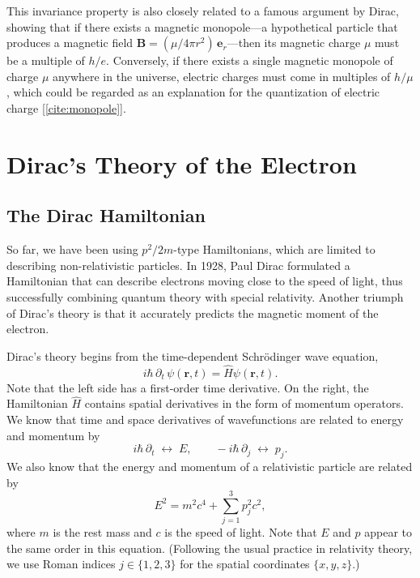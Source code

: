 \documentclass[prx,12pt]{revtex4-2}
\begin{document}
This invariance property is also closely related to a famous argument
by Dirac, showing that if there exists a magnetic monopole---a
hypothetical particle that produces a magnetic field $\mathbf{B} =
(\mu/4\pi r^2)\, \mathbf{e}_r$---then its magnetic charge $\mu$ must
be a multiple of $h/e$.  Conversely, if there exists a single magnetic
monopole of charge $\mu$ anywhere in the universe, electric charges
must come in multiples of $h/\mu$, which could be regarded as an
explanation for the quantization of electric charge
[\ref{cite:monopole}].

\section{Dirac's Theory of the Electron}

\subsection{The Dirac Hamiltonian}
\label{sec:DiracH}

So far, we have been using $p^2/2m$-type Hamiltonians, which are
limited to describing non-relativistic particles.  In 1928, Paul Dirac
formulated a Hamiltonian that can describe electrons moving close to
the speed of light, thus successfully combining quantum theory with
special relativity. Another triumph of Dirac's theory is that it
accurately predicts the magnetic moment of the electron.

Dirac's theory begins from the time-dependent Schr\"odinger wave
equation,
\begin{equation}
  i\hbar\, \partial_t\, \psi(\mathbf{r},t)
  = \hat{H} \psi(\mathbf{r},t).
  \label{schrod}
\end{equation}
Note that the left side has a first-order time derivative.  On the
right, the Hamiltonian $\hat{H}$ contains spatial derivatives in the
form of momentum operators.  We know that time and space derivatives
of wavefunctions are related to energy and momentum by
\begin{equation}
    i\hbar\, \partial_t\; \leftrightarrow \;
    E, \qquad
    -i\hbar\, \partial_j \;\leftrightarrow \;
    p_j.
\end{equation}
We also know that the energy and momentum of a relativistic particle
are related by
\begin{equation}
  E^2 = m^2c^4 + \sum_{j=1}^3 p_j^2c^2,
  \label{Erelativistic}
\end{equation}
where $m$ is the rest mass and $c$ is the speed of light.  Note that
$E$ and $p$ appear to the same order in this equation.  (Following the
usual practice in relativity theory, we use Roman indices $j \in
\{1,2,3\}$ for the spatial coordinates $\{x,y,z\}$.)
\end{document}
